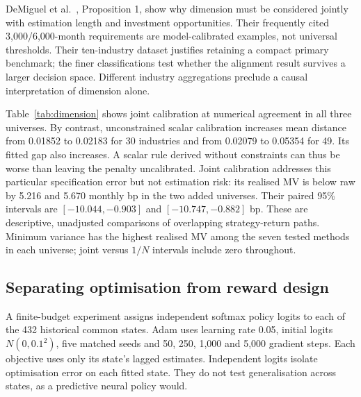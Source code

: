 \documentclass[sigconf,anonymous,review]{acmart}
\begin{document}
DeMiguel et al.~\cite{demiguel2009}, Proposition 1, show why dimension must be considered jointly with estimation length and investment opportunities. Their frequently cited 3,000/6,000-month requirements are model-calibrated examples, not universal thresholds. Their ten-industry dataset justifies retaining a compact primary benchmark; the finer classifications test whether the alignment result survives a larger decision space. Different industry aggregations preclude a causal interpretation of dimension alone.

Table~\ref{tab:dimension} shows joint calibration at numerical agreement in all three universes. By contrast, unconstrained scalar calibration increases mean distance from 0.01852 to 0.02183 for 30 industries and from 0.02079 to 0.05354 for 49. Its fitted gap also increases. A scalar rule derived without constraints can thus be worse than leaving the penalty uncalibrated. Joint calibration addresses this particular specification error but not estimation risk: its realised MV is below raw by 5.216 and 5.670 monthly bp in the two added universes. Their paired 95\% intervals are $[-10.044,-0.903]$ and $[-10.747,-0.882]$ bp. These are descriptive, unadjusted comparisons of overlapping strategy-return paths. Minimum variance has the highest realised MV among the seven tested methods in each universe; joint versus $1/N$ intervals include zero throughout.

\begin{table}[t]
\centering
\caption{Dimension robustness under the same 120-month estimation window, 1990--2025 evaluation and transaction costs. Each cell lists results for $N=10/30/49$. Distances and fitted gaps use common states; realised MV uses own-state net excess returns. Bold identifies our construction. Values below $10^{-8}$ bp in magnitude are reported as zero.}
\label{tab:dimension}

\end{table}

\subsection{Separating optimisation from reward design}
A finite-budget experiment assigns independent softmax policy logits to each of the 432 historical common states. Adam uses learning rate 0.05, initial logits $N(0,0.1^2)$, five matched seeds and 50, 250, 1,000 and 5,000 gradient steps. Each objective uses only its state's lagged estimates. Independent logits isolate optimisation error on each fitted state. They do not test generalisation across states, as a predictive neural policy would.
\end{document}

